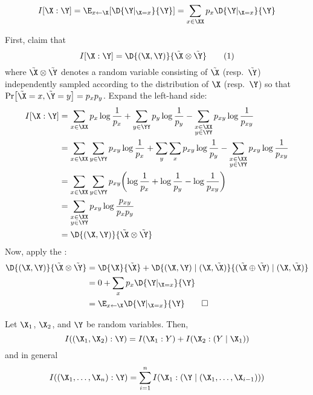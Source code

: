 \documentclass[class=co432,notes,tikz]{agony}
\begin{document}
\begin{fact}
  \[ I[\X : \Y] = \E_{x \gets \X}[\D{\Y|_{\X=x}}{\Y}] = \sum_{x\in\XX}p_x\D{\Y|_{\X=x}}{\Y} \]
\end{fact}
\begin{prf}
  First, claim that
  \[
    I[\X : \Y] = \D{(\X,\Y)}{\tilde\X \otimes \tilde\Y}
    \nr{eq:claim1}
  \]
  where $\tilde\X \otimes \tilde\Y$ denotes a random variable consisting of
  $\tilde\X$ (resp.\ $\tilde\Y$) independently sampled
  according to the distribution of $\X$ (resp.\ $\Y$)
  so that $\Pr[\tilde\X=x,\tilde\Y=y]=p_x p_y$. Expand the left-hand side:
  \begin{align*}
    I[\X : \Y]
     & = \sum_{x\in\XX} p_x \log\frac1{p_x} + \sum_{y\in\YY} p_y \log\frac1{p_y} - \sum_{\substack{x\in\XX\br y\in\YY}}p_{xy}\log\frac1{p_{xy}}                   \\
     & = \sum_{x\in\XX}\sum_{y\in\YY} p_{xy} \log\frac1{p_x} + \sum_y\sum_x p_{xy} \log\frac1{p_y} - \sum_{\substack{x\in\XX\br y\in\YY}}p_{xy}\log\frac1{p_{xy}} \\
     & = \sum_{x\in\XX}\sum_{y\in\YY} p_{xy} \qty(\log\frac1{p_x} + \log\frac1{p_y} - \log\frac1{p_{xy}})                                                         \\
     & = \sum_{\substack{x\in\XX\br y\in\YY}} p_{xy} \log\frac{p_{xy}}{p_x p_y}                                                                                   \\
     & = \D{(\X,\Y)}{\tilde\X \otimes \tilde\Y}
  \end{align*}
  Now, apply the :
  \begin{align*}
    \D{(\X,\Y)}{\tilde\X \otimes \tilde\Y}
     & = \D{\X}{\tilde\X} + \D{(\X,\Y)\mid(\X,\tilde\X)}{(\tilde\X\oplus\tilde\Y)\mid(\X,\tilde\X)} \\
     & = 0 + \sum_x p_x \D{\Y|_{\X=x}}{\Y}                                                          \\
     & = \E_{x\gets\X}\D{\Y|_{\X=x}}{\Y} \qedhere
  \end{align*}
\end{prf}

\begin{theorem}
  Let $\X_1$, $\X_2$, and $\Y$ be random variables. Then,
  \[ I((\X_1,\X_2) : \Y) = I(\X_1 : Y) + I(\X_2 : (Y \mid \X_1)) \]
  and in general
  \[ I((\X_1,\dotsc,\X_n) : \Y) = \sum_{i=1}^n I(\X_1 : (\Y \mid (\X_1,\dotsc,\X_{i-1}))) \]
\end{theorem}
\end{document}
